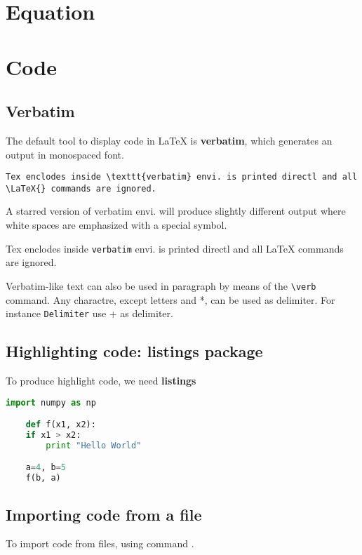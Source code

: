 \lipsum[2]


\section{Equation}

\section{Code}

\subsection{Verbatim}
The default tool to display code in \LaTeX{} is \textbf{verbatim}, which
generates an output in monospaced font. 
\begin{verbatim}
Tex enclodes inside \texttt{verbatim} envi. is printed directl and all
\LaTeX{} commands are ignored.
\end{verbatim}

A starred version of verbatim envi. will produce slightly different output
where white spaces are emphasized with a special symbol.
\begin{verbatim*}
Tex enclodes inside \texttt{verbatim} envi. is printed directl and all
\LaTeX{} commands are ignored.
\end{verbatim*}

Verbatim-like text can also be used in paragraph by means of the
\verb|\verb| command. Any charactre, except letters and *, can be used as
delimiter. For instance \verb+Delimiter+ use + as delimiter.

\subsection{Highlighting code: listings package}
To produce highlight code, we need \textbf{listings}
\begin{lstlisting}[language=Python]
    import numpy as np

    def f(x1, x2):
	if x1 > x2:
	    print "Hello World"

    a=4, b=5
    f(b, a)
\end{lstlisting}

\subsection{Importing code from a file}
To import code from files, using command \verb||.
\begin{lstlisting}[language=TeX]



\end{lstlisting}

